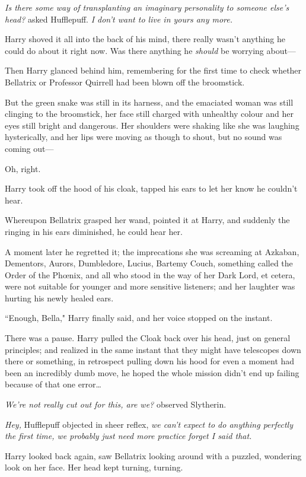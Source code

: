 \emph{Is there some way of transplanting an imaginary personality to someone else's head?} asked Hufflepuff. \emph{I don't want to live in yours any more.}

Harry shoved it all into the back of his mind, there really wasn't anything he could do about it right now. Was there anything he \emph{should} be worrying about—

Then Harry glanced behind him, remembering for the first time to check whether Bellatrix or Professor Quirrell had been blown off the broomstick.

But the green snake was still in its harness, and the emaciated woman was still clinging to the broomstick, her face still charged with unhealthy colour and her eyes still bright and dangerous. Her shoulders were shaking like she was laughing hysterically, and her lips were moving as though to shout, but no sound was coming out—

Oh, right.

Harry took off the hood of his cloak, tapped his ears to let her know he couldn't hear.

Whereupon Bellatrix grasped her wand, pointed it at Harry, and suddenly the ringing in his ears diminished, he could hear her.

A moment later he regretted it; the imprecations she was screaming at Azkaban, Dementors, Aurors, Dumbledore, Lucius, Bartemy Couch, something called the Order of the Phœnix, and all who stood in the way of her Dark Lord, et cetera, were not suitable for younger and more sensitive listeners; and her laughter was hurting his newly healed ears.

``Enough, Bella," Harry finally said, and her voice stopped on the instant.

There was a pause. Harry pulled the Cloak back over his head, just on general principles; and realized in the same instant that they might have telescopes down there or something, in retrospect pulling down his hood for even a moment had been an incredibly dumb move, he hoped the whole mission didn't end up failing because of that one error{\ldots}

\emph{We're not really cut out for this, are we?} observed Slytherin.

\emph{Hey,} Hufflepuff objected in sheer reflex, \emph{we can't expect to do anything perfectly the first time, we probably just need more practice \emph{forget I said that}.}

Harry looked back again, saw Bellatrix looking around with a puzzled, wondering look on her face. Her head kept turning, turning.

